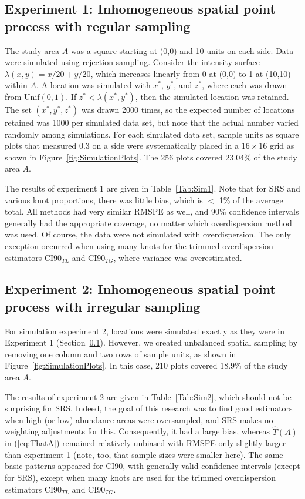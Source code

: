 \documentclass[12pt, titlepage]{article}\usepackage[]{graphicx}\usepackage[]{color}
\def\Unif{\textrm{Unif}}
\begin{document}
\subsection{Experiment 1: Inhomogeneous spatial point process with regular sampling} \label{sec:Exp1}

The study area $A$ was a square starting at (0,0) and 10 units on each side. Data were simulated using rejection sampling.  Consider the intensity surface $\lambda(x,y) = x/20 + y/20$, which increases linearly from 0 at (0,0) to 1 at (10,10) within $A$.  A location was simulated with $x^*$, $y^*$, and $z^*$, where each was drawn from $\Unif(0,1)$. If $z^* < \lambda(x^*,y^*)$, then the simulated location was retained.  The set $(x^*,y^*,z^*)$ was drawn 2000 times, so the expected number of locations retained was 1000 per simulated data set, but note that the actual number varied randomly among simulations.  For each simulated data set, sample units as square plots that measured 0.3 on a side were systematically placed in a $16 \times 16$ grid as shown in Figure~\ref{fig:SimulationPlots}.  The 256 plots covered 23.04\% of the study area $A$.

The results of experiment 1 are given in Table~\ref{Tab:Sim1}. Note that for SRS and various knot proportions, there was little bias, which is $<$ 1\% of the average total.  All methods had very similar RMSPE as well, and 90\% confidence intervals generally had the appropriate coverage, no matter which overdispersion method was used.  Of course, the data were not simulated with overdispersion.  The only exception occurred when using many knots for the trimmed overdispersion estimators CI90$_{TL}$ and CI90$_{TG}$, where variance was overestimated.


\subsection{Experiment 2: Inhomogeneous spatial point process with irregular sampling} \label{sec:Exp2}

For simulation experiment 2, locations were simulated exactly as they were in Experiment 1 (Section~\ref{sec:Exp1}).  However, we created unbalanced spatial sampling by removing one column and two rows of sample units, as shown in Figure~\ref{fig:SimulationPlots}.  In this case, 210 plots covered 18.9\% of the study area $A$.

The results of experiment 2 are given in Table~\ref{Tab:Sim2}, which should not be surprising for SRS.  Indeed, the goal of this research was to find good estimators when high (or low) abundance areas were oversampled, and SRS makes no weighting adjustments for this.  Consequently, it had a large bias, whereas $\widehat{T}(A)$ in (\ref{eq:ThatA}) remained relatively unbiased with RMSPE only slightly larger than experiment 1 (note, too, that sample sizes were smaller here).  The same basic patterns appeared for CI90, with generally valid confidence intervals (except for SRS), except when many knots are used for the trimmed overdispersion estimators CI90$_{TL}$ and CI90$_{TG}$.
\end{document}
